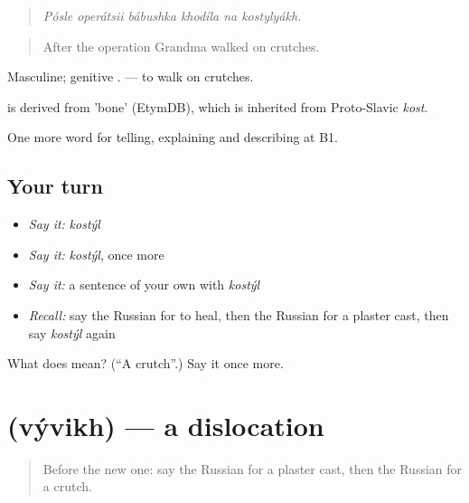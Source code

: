 \begin{quote}
\emph{Pósle operátsii bábushka khodíla na kostylyákh.}
\end{quote}

\begin{quote}
After the operation Grandma walked on crutches.
\end{quote}

Masculine; genitive . \emph{  } — to walk on crutches.

\begin{cousinweb}
\emph{} is derived from \emph{} 'bone' (EtymDB), which is inherited from Proto-Slavic \emph{kost}.
\end{cousinweb}

\begin{grammarlens}[title={What you've built}]
One more word for telling, explaining and describing at B1.
\end{grammarlens}

\subsection*{Your turn}
\begin{itemize}
\raggedright
  \item \emph{Say it:} \emph{kostýl}
  \item \emph{Say it:} \emph{kostýl}, once more
  \item \emph{Say it:} a sentence of your own with \emph{kostýl}
  \item \emph{Recall:} say the Russian for to heal, then the Russian for a plaster cast, then say \emph{kostýl} again
\end{itemize}

\begin{tcolorbox}[breakable,colback=teal!4,colframe=teal!35!black,title={Before you move on}]
What does  mean? (\textquotedblleft{}A crutch\textquotedblright{}.) Say it once more.
\end{tcolorbox}
\section[\texorpdfstring{\ru{вывих} (vývikh)}{вывих (vývikh)}]{ (vývikh) — a dislocation}

\label{lesson:RU-C484-vyvikh}



\begin{quote}
Before the new one: say the Russian for a plaster cast, then the Russian for a crutch.
\end{quote}

